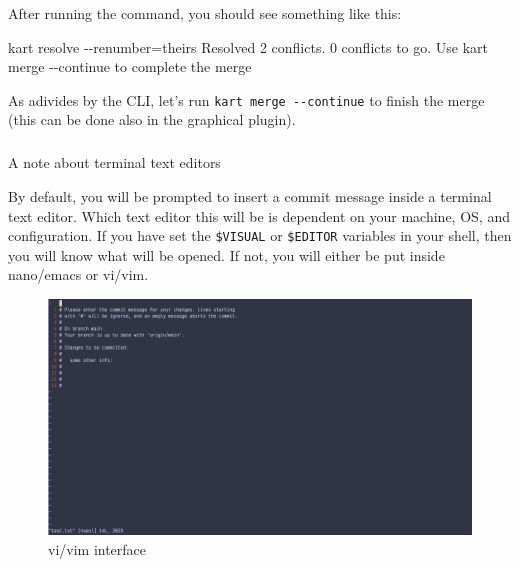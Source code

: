 \documentclass[
  letterpaper,
  DIV=11,
  numbers=noendperiod]{scrartcl}
\makeatletter
\let\oldsubparagraph\subparagraph
\renewcommand{\subparagraph}{
    \@ifstar
      \xxxSubParagraphStar
      \xxxSubParagraphNoStar
  }
\newcommand{\xxxSubParagraphStar}[1]{\oldsubparagraph*{#1}\mbox{}}
\newcommand{\xxxSubParagraphNoStar}[1]{\oldsubparagraph{#1}\mbox{}}
\newenvironment{Shaded}{\begin{snugshade}}{\end{snugshade}}
\newcommand{\AttributeTok}[1]{\textcolor[rgb]{1.00,0.47,0.78}{#1}}
\newcommand{\ExtensionTok}[1]{\textcolor[rgb]{0.55,0.91,0.99}{#1}}
\newcommand{\KeywordTok}[1]{\textcolor[rgb]{1.00,0.47,0.78}{#1}}
\newcommand{\NormalTok}[1]{\textcolor[rgb]{0.97,0.97,0.95}{#1}}
\newcommand{\OperatorTok}[1]{\textcolor[rgb]{0.97,0.97,0.95}{#1}}
\makeatother
\begin{document}
After running the command, you should see something like this:

\begin{Shaded}
\begin{Highlighting}[]
\ExtensionTok{kart}\NormalTok{ resolve }\AttributeTok{{-}{-}renumber}\OperatorTok{=}\NormalTok{theirs}
\ExtensionTok{Resolved}\NormalTok{ 2 conflicts. 0 conflicts to go.}
\ExtensionTok{Use} \KeywordTok{\textasciigrave{}}\ExtensionTok{kart}\NormalTok{ merge }\AttributeTok{{-}{-}continue}\KeywordTok{\textasciigrave{}}\NormalTok{ to complete the merge}
\end{Highlighting}
\end{Shaded}

As adivides by the CLI, let's run \texttt{kart\ merge\ -\/-continue} to
finish the merge (this can be done also in the graphical plugin).

\subparagraph{A note about terminal text
editors}\label{sec-text-editors}

By default, you will be prompted to insert a commit message inside a
terminal text editor. Which text editor this will be is dependent on
your machine, OS, and configuration. If you have set the
\texttt{\$VISUAL} or \texttt{\$EDITOR} variables in your shell, then you
will know what will be opened. If not, you will either be put inside
nano/emacs or vi/vim.

\begin{tcolorbox}[enhanced jigsaw, arc=.35mm, colbacktitle=quarto-callout-note-color!10!white, colframe=quarto-callout-note-color-frame, coltitle=black, breakable, left=2mm, bottomrule=.15mm, rightrule=.15mm, opacitybacktitle=0.6, titlerule=0mm, opacityback=0, toptitle=1mm, title={With some possible differences, the interface will be like this for
vi/vim}, toprule=.15mm, bottomtitle=1mm, colback=white, leftrule=.75mm]

\begin{figure}[H]

{\centering \includegraphics{img/vi_interface.png}

}

\caption{vi/vim interface}

\end{figure}%

\end{tcolorbox}
\end{document}
